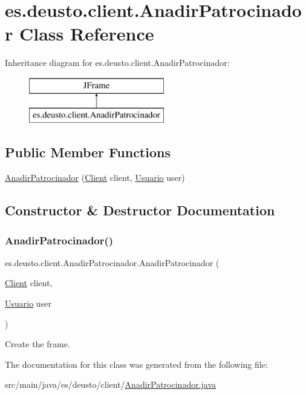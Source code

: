 \hypertarget{classes_1_1deusto_1_1client_1_1_anadir_patrocinador}{}\section{es.\+deusto.\+client.\+Anadir\+Patrocinador Class Reference}
\label{classes_1_1deusto_1_1client_1_1_anadir_patrocinador}
Inheritance diagram for es.\+deusto.\+client.\+Anadir\+Patrocinador\+:\begin{figure}[H]
\begin{center}
\leavevmode
\includegraphics[height=2.000000cm]{classes_1_1deusto_1_1client_1_1_anadir_patrocinador}
\end{center}
\end{figure}
\subsection*{Public Member Functions}
\begin{DoxyCompactItemize}
\item 
\mbox{\hyperlink{classes_1_1deusto_1_1client_1_1_anadir_patrocinador_a3735933a23df8aedc65cf1916c85f660}{Anadir\+Patrocinador}} (\mbox{\hyperlink{classes_1_1deusto_1_1client_1_1_client}{Client}} client, \mbox{\hyperlink{classes_1_1deusto_1_1server_1_1jdo_1_1_usuario}{Usuario}} user)
\end{DoxyCompactItemize}


\subsection{Constructor \& Destructor Documentation}
\mbox{\label{classes_1_1deusto_1_1client_1_1_anadir_patrocinador_a3735933a23df8aedc65cf1916c85f660}} 
\subsubsection{\texorpdfstring{AnadirPatrocinador()}{AnadirPatrocinador()}}
{\footnotesize\ttfamily es.\+deusto.\+client.\+Anadir\+Patrocinador.\+Anadir\+Patrocinador (\begin{DoxyParamCaption}\item[{\mbox{\hyperlink{classes_1_1deusto_1_1client_1_1_client}{Client}}}]{client,  }\item[{\mbox{\hyperlink{classes_1_1deusto_1_1server_1_1jdo_1_1_usuario}{Usuario}}}]{user }\end{DoxyParamCaption})}

Create the frame. 

The documentation for this class was generated from the following file\+:\begin{DoxyCompactItemize}
\item 
src/main/java/es/deusto/client/\mbox{\hyperlink{_anadir_patrocinador_8java}{Anadir\+Patrocinador.\+java}}\end{DoxyCompactItemize}
